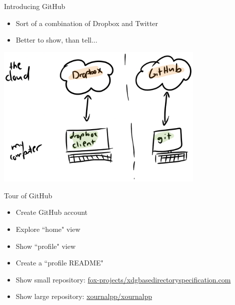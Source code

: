 \documentclass{beamer}
\begin{document}
\begin{frame}{Introducing GitHub}
	\begin{itemize}
		\item Sort of a combination of Dropbox and Twitter
		\item Better to show, than tell...
	\end{itemize}

	\includegraphics[width=10cm]{dropbox-github.png} \newline

\end{frame}

\begin{frame}{Tour of GitHub}
	\begin{itemize}
		\item Create GitHub account
		\item Explore ``home" view
		\item Show ``profile" view
		\item Create a ``profile README"
		\item Show small repository: \href{https://github.com/fox-projects/xdgbasedirectoryspecification.com}{fox-projects/xdgbasedirectoryspecification.com}
		\item Show large repository: \href{https://github.com/xournalpp/xournalpp}{xournalpp/xournalpp}
	\end{itemize}

\end{frame}
\end{document}

